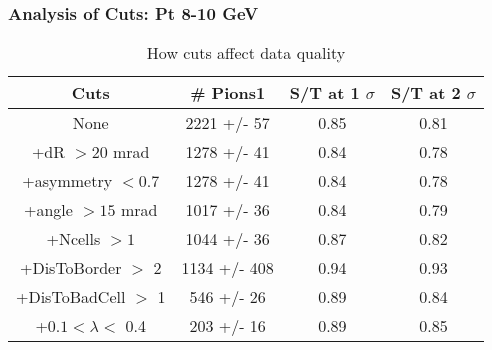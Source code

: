 \frame
{
\frametitle{Analysis of Cuts: Pt  8-10 GeV}
\begin{table}
\caption{How cuts affect data quality}
\centering
\begin{tabular}{c c c c}
\hline\hline
Cuts & \# Pions1 & S/T at 1 $\sigma$ & S/T at 2 $\sigma$ \\ [0.5ex]
\hline
None & 2221 +/-   57 & 0.85 & 0.81 \\ %
+dR $> 20$ mrad & 1278 +/-   41 & 0.84 & 0.78 \\ %
+asymmetry $< 0.7$ & 1278 +/-   41 & 0.84 & 0.78 \\ %
+angle $> 15$ mrad & 1017 +/-   36 & 0.84 & 0.79 \\ %
+Ncells $> 1$& 1044 +/-   36 & 0.87 & 0.82 \\ %
+DisToBorder $>$ 2 & 1134 +/-  408 & 0.94 & 0.93 \\ %
+DisToBadCell $>$ 1&  546 +/-   26 & 0.89 & 0.84 \\ %
+$0.1 < \lambda <$ 0.4 &  203 +/-   16 & 0.89 & 0.85 \\ %
[1ex]
\hline
\end{tabular}
\label{table:nonlin}
\end{table}
}
